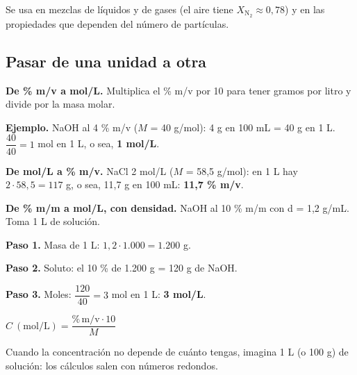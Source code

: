 \begin{clave} Se usa en mezclas de líquidos y de gases (el aire tiene $X_{\text{N}_2} \approx 0{,}78$) y en las propiedades que dependen del número de partículas.\end{clave}
\subsection{Pasar de una unidad a otra}
\textbf{De \% m/v a mol/L.} Multiplica el \% m/v por 10 para tener gramos por litro y divide por la masa molar.

 

\textbf{Ejemplo.} NaOH al 4 \% m/v ($M$ = 40 g/mol): 4 g en 100 mL = 40 g en 1 L. $\dfrac{40}{40} = 1$ mol en 1 L, o sea, \textbf{1 mol/L}.

 

\textbf{De mol/L a \% m/v.} NaCl 2 mol/L ($M$ = 58,5 g/mol): en 1 L hay $2\cdot 58{,}5 = 117$ g, o sea, 11,7 g en 100 mL: \textbf{11,7 \% m/v}.

 

\textbf{De \% m/m a mol/L, con densidad.} NaOH al 10 \% m/m con d = 1,2 g/mL. Toma 1 L de solución.

 

\textbf{Paso 1.} Masa de 1 L: $1{,}2 \cdot 1.000 = 1.200$ g.

 

\textbf{Paso 2.} Soluto: el 10 \% de 1.200 g = 120 g de NaOH.

 

\textbf{Paso 3.} Moles: $\dfrac{120}{40} = 3$ mol en 1 L: \textbf{3 mol/L}.

  
\begin{clave} $C\ (\text{mol/L}) = \dfrac{\%\,\text{m/v} \cdot 10}{M}$\end{clave}
 
\begin{ojo} Cuando la concentración no depende de cuánto tengas, imagina 1 L (o 100 g) de solución: los cálculos salen con números redondos.\end{ojo}
